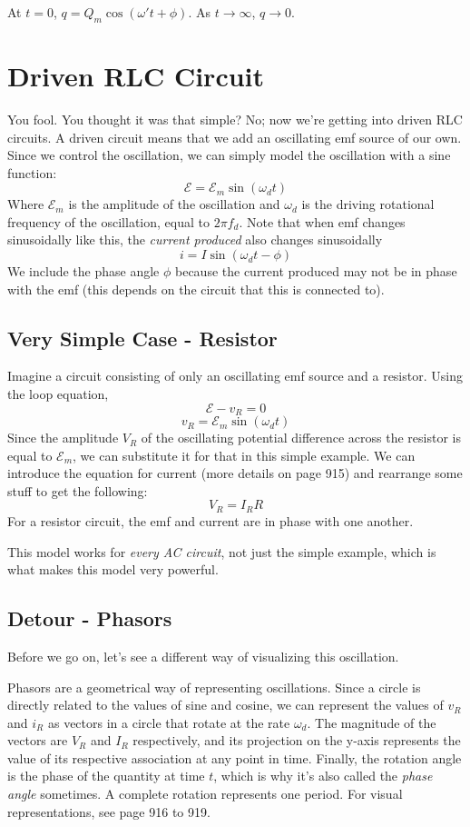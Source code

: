 \documentclass[]{article}
\begin{document}
At $ t = 0 $, $ q = Q_m \cos\left(\omega ' t + \phi\right) $. As $ t \to \infty $, $ q \to 0 $.

\section{Driven RLC Circuit}
You fool. You thought it was that simple? No; now we're getting into driven RLC circuits. A driven circuit means that we add an oscillating emf source of our own. Since we control the oscillation, we can simply model the oscillation with a sine function:
\[ \mathcal{E} = \mathcal{E}_m \sin \left(\omega_d t\right) \]
Where $ \mathcal{E}_m $ is the amplitude of the oscillation and $ \omega_d $ is the driving rotational frequency of the oscillation, equal to $ 2 \pi f_d $. Note that when emf changes sinusoidally like this, the \emph{current produced} also changes sinusoidally
\[ i = I \sin \left(\omega_d t - \phi\right) \]
We include the phase angle $ \phi $ because the current produced may not be in phase with the emf (this depends on the circuit that this is connected to).

\subsection{Very Simple Case - Resistor}
Imagine a circuit consisting of only an oscillating emf source and a resistor. Using the loop equation,
\[ \mathcal{E} - v_R = 0 \]
\[ v_R = \mathcal{E}_m \sin \left(\omega_d t\right) \]
Since the amplitude $ V_R $ of the oscillating potential difference across the resistor is equal to $ \mathcal{E}_m $, we can substitute it for that in this simple example. We can introduce the equation for current (more details on page 915) and rearrange some stuff to get the following:
\[ V_R = I_R R \]
For a resistor circuit, the emf and current are in phase with one another.

This model works for \emph{every AC circuit}, not just the simple example, which is what makes this model very powerful.

\subsection{Detour - Phasors}
Before we go on, let's see a different way of visualizing this oscillation.

Phasors are a geometrical way of representing oscillations. Since a circle is directly related to the values of sine and cosine, we can represent the values of $ v_R $ and $ i_R $ as vectors in a circle that rotate at the rate $ \omega_d $. The magnitude of the vectors are $ V_R $ and $ I_R $ respectively, and its projection on the y-axis represents the value of its respective association at any point in time. Finally, the rotation angle is the phase of the quantity at time $ t $, which is why it's also called the \emph{phase angle} sometimes. A complete rotation represents one period. For visual representations, see page 916 to 919.
\end{document}
